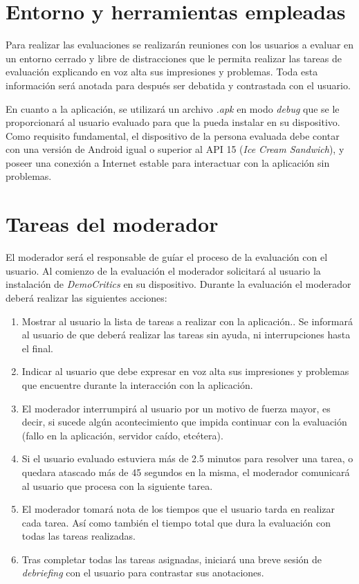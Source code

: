 \section{Entorno y herramientas empleadas}

Para realizar las evaluaciones se realizarán reuniones con los usuarios a evaluar en un entorno cerrado y libre de distracciones que le permita realizar las tareas de evaluación explicando en voz alta sus impresiones y problemas. Toda esta información será anotada para después ser debatida y contrastada con el usuario.

En cuanto a la aplicación, se utilizará un archivo \textit{.apk} en modo \textit{debug} que se le proporcionará al usuario evaluado para que la pueda instalar en su dispositivo. Como requisito fundamental, el dispositivo de la persona evaluada debe contar con una versión de Android igual o superior al API 15 (\textit{Ice Cream Sandwich}), y poseer una conexión a Internet estable para interactuar con la aplicación sin problemas.

\section{Tareas del moderador}

El moderador será el responsable de guíar el proceso de la evaluación con el usuario. Al comienzo de la evaluación el moderador solicitará al usuario la instalación de \textit{DemoCritics} en su dispositivo. Durante la evaluación el moderador deberá realizar las siguientes acciones:

\begin{enumerate}
 \item Mostrar al usuario la lista de tareas a realizar con la aplicación.. Se informará al usuario de que deberá realizar las tareas sin ayuda, ni interrupciones hasta el final.
 \item Indicar al usuario que debe expresar en voz alta sus impresiones y problemas que encuentre durante la interacción con la aplicación.
 \item El moderador interrumpirá al usuario por un motivo de fuerza mayor, es decir, si sucede algún acontecimiento que impida continuar con la evaluación (fallo en la aplicación, servidor caído, etcétera).
 \item Si el usuario evaluado estuviera más de 2.5 minutos para resolver una tarea, o quedara atascado más de 45 segundos en la misma, el moderador comunicará al usuario que procesa con la siguiente tarea.
 \item El moderador tomará nota de los tiempos que el usuario tarda en realizar cada tarea. Así como también el tiempo total que dura la evaluación con todas las tareas realizadas.
 \item Tras completar todas las tareas asignadas, iniciará una breve sesión de \textit{debriefing} con el usuario para contrastar sus anotaciones.
\end{enumerate}

